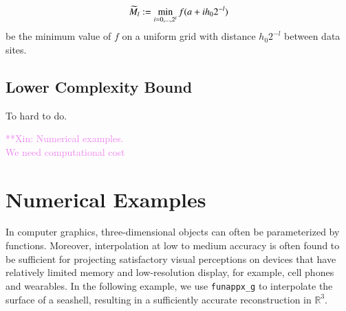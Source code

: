 \documentclass[review]{elsarticle}
\theoremstyle{definition}
\newcommand{\xinnote}[1]{ {\textcolor{violet}  {\mbox{**Xin:} #1}}}
\newcommand{\funappxg}{\texttt{funappx\_g\xspace}}
\begin{document}
\[
\widetilde{M}_l : = \min_{i=0, \ldots, 2^l} f(a+ih_0 2^{-l})
\]
be the minimum value of $f$ on a uniform grid with distance $h_0 2^{-l}$ between data sites.

\subsection{Lower Complexity Bound} \label{subsec:optcomp}  To hard to do.

\xinnote{
	Numerical examples.\\
	We need computational cost\\
}


\section{Numerical Examples}


In computer graphics, three-dimensional objects can often be parameterized by
functions. Moreover, interpolation at low to medium accuracy is often found to
be sufficient for projecting satisfactory visual perceptions on devices that
have relatively limited memory and low-resolution display, for example,
cell phones and wearables. In the following example, we use \funappxg{} to
interpolate the surface of a seashell, resulting in a sufficiently accurate
reconstruction in $\mathbb{R}^3$.
\end{document}
